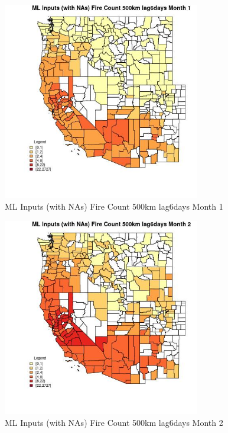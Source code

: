 \begin{figure} 
\centering  
\includegraphics[width=0.77\textwidth]{Code_Outputs/Report_ML_input_PM25_Step4_part_f_de_duplicated_aves_prioritize_24hr_obswNAs_CountyFire_Count_500km_lag6daysmedianMonth1.jpg} 
\caption{\label{fig:Report_ML_input_PM25_Step4_part_f_de_duplicated_aves_prioritize_24hr_obswNAsCountyFire_Count_500km_lag6daysmedianMonth1}ML Inputs (with NAs) Fire Count 500km lag6days Month 1} 
\end{figure} 
 

\begin{figure} 
\centering  
\includegraphics[width=0.77\textwidth]{Code_Outputs/Report_ML_input_PM25_Step4_part_f_de_duplicated_aves_prioritize_24hr_obswNAs_CountyFire_Count_500km_lag6daysmedianMonth2.jpg} 
\caption{\label{fig:Report_ML_input_PM25_Step4_part_f_de_duplicated_aves_prioritize_24hr_obswNAsCountyFire_Count_500km_lag6daysmedianMonth2}ML Inputs (with NAs) Fire Count 500km lag6days Month 2} 
\end{figure} 
 

